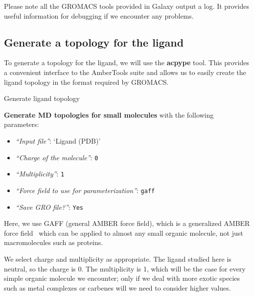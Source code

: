 \documentclass[twocolumn]{bmcart}%
\providecommand{\tightlist}{%
  \setlength{\itemsep}{0pt}\setlength{\parskip}{0pt}}
\begin{document}
Please note all the GROMACS tools provided in Galaxy output a log. It provides useful information for
debugging if we encounter any problems.

\subsection*{Generate a topology for the
ligand}\label{generate-a-topology-for-the-ligand}

To generate a topology for the ligand, we will use the \textbf{acpype}
tool. This provides a convenient interface to the AmberTools suite and
allows us to easily create the ligand topology in the format required by
GROMACS.

\begin{handson_box_colour}{Generate ligand topology}

  \textbf{Generate MD topologies for small molecules} with the following
  parameters:

  \begin{itemize}
  \tightlist
  \item
    \emph{``Input file''}: `Ligand (PDB)'
  \item
    \emph{``Charge of the molecule''}: \texttt{0}
  \item
    \emph{``Multiplicity''}: \texttt{1}
  \item
    \emph{``Force field to use for parameterization''}:
    \texttt{gaff}
  \item
    \emph{``Save GRO file?''}: \texttt{Yes}
  \end{itemize}

\end{handson_box_colour}

Here, we use GAFF (general AMBER force field), which is a generalized AMBER force field~\cite{Wang2004} which can be applied to almost any small organic molecule, not just macromolecules such as proteins.

We select charge and multiplicity as appropriate. The ligand studied here is neutral, so the charge is 0. The multiplicity is 1, which will be the case for every simple organic molecule we encounter; only if we deal with more exotic species such as metal complexes or carbenes will we need to consider higher values.
\end{document}
